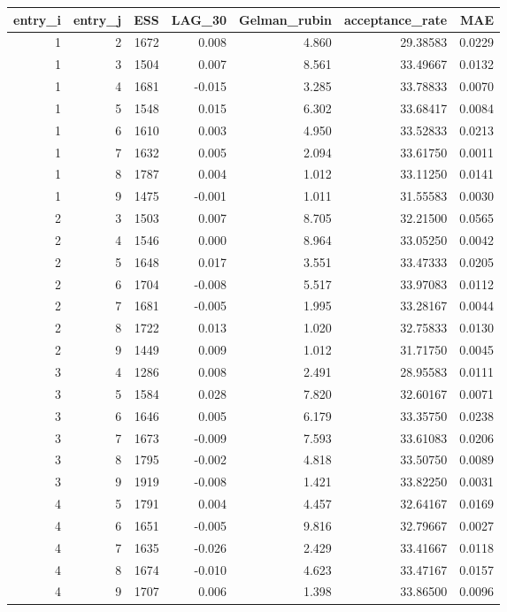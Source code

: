 \begin{longtable}{rrrrrrr}
\toprule
entry\_i & entry\_j & ESS & LAG\_30 & Gelman\_rubin & acceptance\_rate & MAE \\ 
\midrule
1 & 2 & 1672 & 0.008 & 4.860 & 29.38583 & 0.0229 \\ 
1 & 3 & 1504 & 0.007 & 8.561 & 33.49667 & 0.0132 \\ 
1 & 4 & 1681 & -0.015 & 3.285 & 33.78833 & 0.0070 \\ 
1 & 5 & 1548 & 0.015 & 6.302 & 33.68417 & 0.0084 \\ 
1 & 6 & 1610 & 0.003 & 4.950 & 33.52833 & 0.0213 \\ 
1 & 7 & 1632 & 0.005 & 2.094 & 33.61750 & 0.0011 \\ 
1 & 8 & 1787 & 0.004 & 1.012 & 33.11250 & 0.0141 \\ 
1 & 9 & 1475 & -0.001 & 1.011 & 31.55583 & 0.0030 \\ 
2 & 3 & 1503 & 0.007 & 8.705 & 32.21500 & 0.0565 \\ 
2 & 4 & 1546 & 0.000 & 8.964 & 33.05250 & 0.0042 \\ 
2 & 5 & 1648 & 0.017 & 3.551 & 33.47333 & 0.0205 \\ 
2 & 6 & 1704 & -0.008 & 5.517 & 33.97083 & 0.0112 \\ 
2 & 7 & 1681 & -0.005 & 1.995 & 33.28167 & 0.0044 \\ 
2 & 8 & 1722 & 0.013 & 1.020 & 32.75833 & 0.0130 \\ 
2 & 9 & 1449 & 0.009 & 1.012 & 31.71750 & 0.0045 \\ 
3 & 4 & 1286 & 0.008 & 2.491 & 28.95583 & 0.0111 \\ 
3 & 5 & 1584 & 0.028 & 7.820 & 32.60167 & 0.0071 \\ 
3 & 6 & 1646 & 0.005 & 6.179 & 33.35750 & 0.0238 \\ 
3 & 7 & 1673 & -0.009 & 7.593 & 33.61083 & 0.0206 \\ 
3 & 8 & 1795 & -0.002 & 4.818 & 33.50750 & 0.0089 \\ 
3 & 9 & 1919 & -0.008 & 1.421 & 33.82250 & 0.0031 \\ 
4 & 5 & 1791 & 0.004 & 4.457 & 32.64167 & 0.0169 \\ 
4 & 6 & 1651 & -0.005 & 9.816 & 32.79667 & 0.0027 \\ 
4 & 7 & 1635 & -0.026 & 2.429 & 33.41667 & 0.0118 \\ 
4 & 8 & 1674 & -0.010 & 4.623 & 33.47167 & 0.0157 \\ 
4 & 9 & 1707 & 0.006 & 1.398 & 33.86500 & 0.0096 \\ 

\end{longtable}
